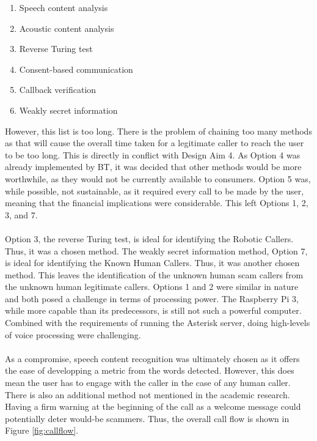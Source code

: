 \documentclass[main.tex]{subfiles}
\begin{document}
\begin{enumerate}
	\item Speech content analysis
	\item Acoustic content analysis
	\item Reverse Turing test
	\item Consent-based communication
	\item Callback verification
	\item Weakly secret information
\end{enumerate}

However, this list is too long. There is the problem of chaining too many methods as that will cause the overall time taken for a legitimate caller to reach the user to be too long. This is directly in conflict with Design Aim 4. As Option 4 was already implemented by BT, it was decided that other methods would be more worthwhile, as they would not be currently available to consumers. Option 5 was, while possible, not sustainable, as it required every call to be made by the user, meaning that the financial implications were considerable. This left Options 1, 2, 3, and 7.
\\\\
Option 3, the reverse Turing test, is ideal for identifying the Robotic Callers. Thus, it was a chosen method. The weakly secret information method, Option 7, is ideal for identifying the Known Human Callers. Thus, it was another chosen method. This leaves the identification of the unknown human scam callers from the unknown human legitimate callers. Options 1 and 2 were similar in nature and both posed a challenge in terms of processing power. The Raspberry Pi 3, while more capable than its predecessors, is still not such a powerful computer. Combined with the requirements of running the Asterisk server, doing high-levels of voice processing were challenging.
\\\\
As a compromise, speech content recognition was ultimately chosen as it offers the ease of developping a metric from the words detected. However, this does mean the user has to engage with the caller in the case of any human caller. There is also an additional method not mentioned in the academic research. Having a firm warning at the beginning of the call as a welcome message could potentially deter would-be scammers. Thus, the overall call flow is shown in Figure \ref{fig:callflow}.
\end{document}
